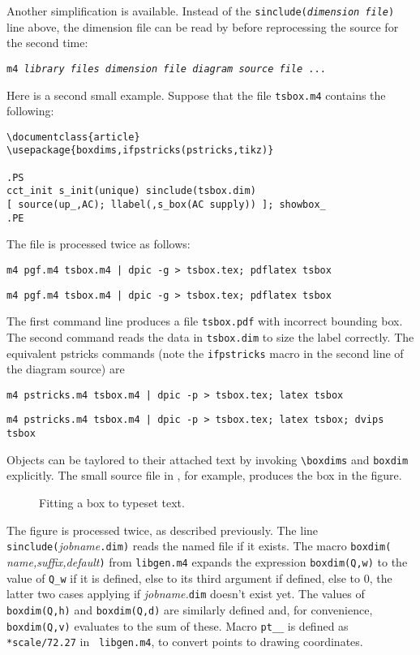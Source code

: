Another simplification is available.  Instead of the
{\tt sinclude({\sl dimension file})} line
above, the dimension file can be read by \Mfour before reprocessing the source
for the second time:

{\tt m4 {\sl library files} {\sl dimension file} {\sl diagram source file} ...} 

Here is a second small example.  Suppose that the file {\tt tsbox.m4} contains
the following:

\begin{verbatim}
\documentclass{article}
\usepackage{boxdims,ifpstricks(pstricks,tikz)}

.PS
cct_init s_init(unique) sinclude(tsbox.dim)
[ source(up_,AC); llabel(,s_box(AC supply)) ]; showbox_
.PE

\end{verbatim}
The file is processed twice as follows:

{\tt m4 pgf.m4 tsbox.m4 | dpic -g > tsbox.tex; pdflatex tsbox}
\par
{\tt m4 pgf.m4 tsbox.m4 | dpic -g > tsbox.tex; pdflatex tsbox}

\noindent
The first command line produces a file {\tt tsbox.pdf} with
incorrect bounding box.  The second command reads the data in {\tt tsbox.dim}
to size the label correctly.  The equivalent pstricks commands (note
the {\tt ifpstricks} macro in the second line of the diagram source) are

{\tt m4 pstricks.m4 tsbox.m4 | dpic -p > tsbox.tex; latex tsbox}
\par
{\tt m4 pstricks.m4 tsbox.m4 | dpic -p > tsbox.tex; latex tsbox; dvips tsbox}
 
\hbox{}

Objects can be taylored to their attached text by invoking
\verb|\boxdims| and \verb|boxdim| explicitly.
The small source file in , for example,
produces the box in the figure.
\begin{figure}[H]
   \parbox{4.2in}{\small  }%
   \hfill\llap{\raise-0.35in\hbox{ }}%
   \vspace{-\baselineskip}
   \caption{Fitting a box to typeset text.}
   \label{boxdims}
   \end{figure}

The figure is processed twice, as described previously.
The line \verb|sinclude(|{\sl jobname}\verb|.dim)| reads the named file
if it exists.  The macro \verb|boxdim(|{\sl
name,suffix,default}\verb|)| from {\tt libgen.m4} expands the
expression \verb|boxdim(Q,w)| to the value of \verb|Q_w| if it is
defined, else to its third argument if defined, else to 0, the latter
two cases applying if {\sl jobname.}\verb|dim| doesn't exist yet.  The
values of \verb|boxdim(Q,h)| and \verb|boxdim(Q,d)| are similarly
defined and, for convenience, \verb|boxdim(Q,v)| evaluates to the sum
of these.  Macro \verb|pt__| is defined as \verb|*scale/72.27| in {\tt
libgen.m4}, to convert points to drawing coordinates.

